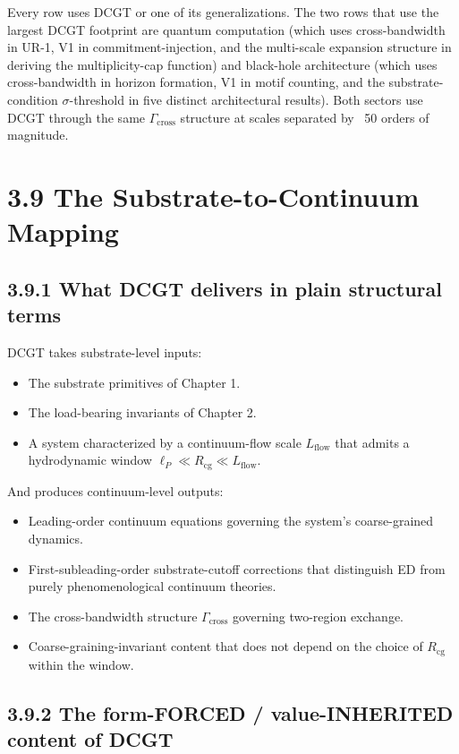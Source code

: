 \documentclass[11pt]{book}
\begin{document}
Every row uses DCGT or one of its generalizations. The two rows that use the largest DCGT footprint are quantum computation (which uses cross-bandwidth in UR-1, V1 in commitment-injection, and the multi-scale expansion structure in deriving the multiplicity-cap function) and black-hole architecture (which uses cross-bandwidth in horizon formation, V1 in motif counting, and the substrate-condition $\sigma$-threshold in five distinct architectural results). Both sectors use DCGT through the same $\Gamma_\mathrm{cross}$ structure at scales separated by ~50 orders of magnitude.

\section{3.9 The Substrate-to-Continuum Mapping}

\subsection{3.9.1 What DCGT delivers in plain structural terms}

DCGT takes substrate-level inputs:
\begin{itemize}
\item The substrate primitives of Chapter 1.
\item The load-bearing invariants of Chapter 2.
\item A system characterized by a continuum-flow scale $L_\mathrm{flow}$ that admits a hydrodynamic window $\ell_P \ll R_\mathrm{cg} \ll L_\mathrm{flow}$.
\end{itemize}

And produces continuum-level outputs:
\begin{itemize}
\item Leading-order continuum equations governing the system's coarse-grained dynamics.
\item First-subleading-order substrate-cutoff corrections that distinguish ED from purely phenomenological continuum theories.
\item The cross-bandwidth structure $\Gamma_\mathrm{cross}$ governing two-region exchange.
\item Coarse-graining-invariant content that does not depend on the choice of $R_\mathrm{cg}$ within the window.
\end{itemize}

\subsection{3.9.2 The form-FORCED / value-INHERITED content of DCGT}
\end{document}

